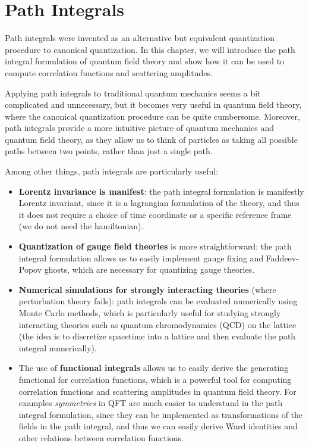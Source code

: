\chapter{Path Integrals}

Path integrals were invented as an alternative but equivalent quantization procedure to canonical quantization. In this chapter, we will introduce the path integral formulation of quantum field theory and show how it can be used to compute correlation functions and scattering amplitudes.

Applying path integrals to traditional quantum mechanics seems a bit complicated and unnecessary, but it becomes very useful in quantum field theory, where the canonical quantization procedure can be quite cumbersome. Moreover, path integrals provide a more intuitive picture of quantum mechanics and quantum field theory, as they allow us to think of particles as taking all possible paths between two points, rather than just a single path.

Among other things, path integrals are particularly useful:
\begin{itemize}
    \item \textbf{Lorentz invariance is manifest}: the path integral formulation is manifestly Lorentz invariant, since it is a lagrangian formulation of the theory, and thus it does not require a choice of time coordinate or a specific reference frame (we do not need the hamiltonian).
    \item \textbf{Quantization of gauge field theories} is more straightforward: the path integral formulation allows us to easily implement gauge fixing and Faddeev-Popov ghosts, which are necessary for quantizing gauge theories.
    \item \textbf{Numerical simulations for strongly interacting theories} (where perturbation theory fails): path integrals can be evaluated numerically using Monte Carlo methods, which is particularly useful for studying strongly interacting theories such as quantum chromodynamics (QCD) on the lattice (the idea is to discretize spacetime into a lattice and then evaluate the path integral numerically).
    \item The use of \textbf{functional integrals} allows us to easily derive the generating functional for correlation functions, which is a powerful tool for computing correlation functions and scattering amplitudes in quantum field theory. For examples \textit{symmetries} in QFT are much easier to understand in the path integral formulation, since they can be implemented as transformations of the fields in the path integral, and thus we can easily derive Ward identities and other relations between correlation functions.
\end{itemize}

